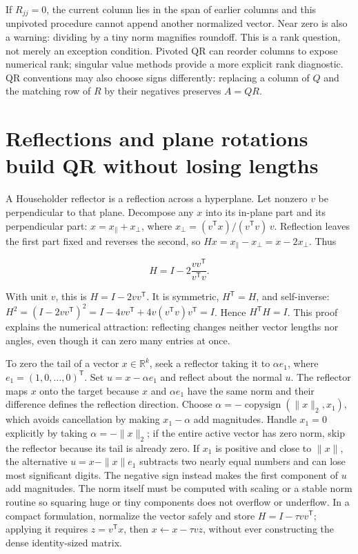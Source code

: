 If \(R_{jj}=0\), the current column lies in the span of earlier columns and this unpivoted procedure cannot append another normalized vector. Near zero is also a warning: dividing by a tiny norm magnifies roundoff. This is a rank question, not merely an exception condition. Pivoted QR can reorder columns to expose numerical rank; singular value methods provide a more explicit rank diagnostic. QR conventions may also choose signs differently: replacing a column of \(Q\) and the matching row of \(R\) by their negatives preserves \(A=QR\).

\section{Reflections and plane rotations build QR without losing lengths}\label{01-foundations-i-ch020-reflections-and-plane-rotations-build-qr-without-losing-lengths}

\hypertarget{01-foundations-i-ch020-reflections-and-plane-rotations-build-qr-without-losing-lengths}{}

A Householder reflector is a reflection across a hyperplane. Let nonzero \(v\) be perpendicular to that plane. Decompose any \(x\) into its in-plane part and its perpendicular part: \(x=x_\parallel+x_\perp\), where \(x_\perp=(v^\mathsf Tx)/(v^\mathsf Tv)\,v\). Reflection leaves the first part fixed and reverses the second, so \(Hx=x_\parallel-x_\perp=x-2x_\perp\). Thus

\[
H=I-2\frac{vv^\mathsf T}{v^\mathsf Tv}.
\]

With unit \(v\), this is \(H=I-2vv^\mathsf T\). It is symmetric, \(H^\mathsf T=H\), and self-inverse: \(H^2=(I-2vv^\mathsf T)^2=I-4vv^\mathsf T+4v(v^\mathsf Tv)v^\mathsf T=I\). Hence \(H^\mathsf TH=I\). This proof explains the numerical attraction: reflecting changes neither vector lengths nor angles, even though it can zero many entries at once.

To zero the tail of a vector \(x\in\mathbb R^k\), seek a reflector taking it to \(\alpha e_1\), where \(e_1=(1,0,\ldots,0)^\mathsf T\). Set \(u=x-\alpha e_1\) and reflect about the normal \(u\). The reflector maps \(x\) onto the target because \(x\) and \(\alpha e_1\) have the same norm and their difference defines the reflection direction. Choose \(\alpha=-\operatorname{copysign}(\|x\|_2,x_1)\), which avoids cancellation by making \(x_1-\alpha\) add magnitudes. Handle \(x_1=0\) explicitly by taking \(\alpha=-\|x\|_2\); if the entire active vector has zero norm, skip the reflector because its tail is already zero. If \(x_1\) is positive and close to \(\|x\|\), the alternative \(u=x-\|x\|e_1\) subtracts two nearly equal numbers and can lose most significant digits. The negative sign instead makes the first component of \(u\) add magnitudes. The norm itself must be computed with scaling or a stable norm routine so squaring huge or tiny components does not overflow or underflow. In a compact formulation, normalize the vector safely and store \(H=I-\tau v v^\mathsf T\); applying it requires \(z=v^\mathsf Tx\), then \(x\leftarrow x-\tau vz\), without ever constructing the dense identity-sized matrix.

